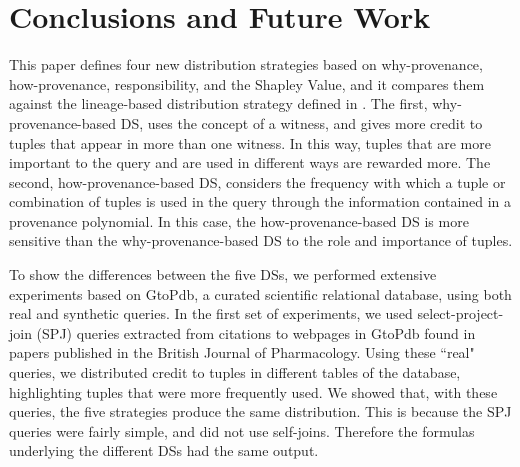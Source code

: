 \section{Conclusions and Future Work}
\label{section:conclusions}

This paper 
defines four new distribution strategies based on why-provenance, how-provenance, responsibility, and the Shapley Value, and it compares them against the lineage-based distribution strategy defined in \cite{dosso2020data}. 
The first, why-provenance-based DS, uses the concept of a witness, and gives more credit to tuples that appear in more than one witness. 
In this way, tuples that are more important to the query and are used in different ways are rewarded more. %
The second, how-provenance-based DS, considers the frequency with which a tuple or combination of tuples is used in the query through the information contained in a provenance polynomial. In this case, the how-provenance-based DS is more sensitive than the why-provenance-based DS to the role and importance of tuples.

To show the differences between the five DSs, we performed extensive experiments based on GtoPdb, a curated scientific relational database, using both real and synthetic queries. 
In the first set of experiments, we used select-project-join (SPJ) queries extracted from citations to webpages in GtoPdb found in papers published in the British Journal of Pharmacology. 
Using these ``real" queries, we distributed credit to tuples in different tables of the database, highlighting tuples that were more frequently used. 
We showed that, with these queries, the five strategies produce the same distribution. This is because the SPJ queries were fairly simple, and did not use self-joins. Therefore the formulas underlying the different DSs had the same output.

